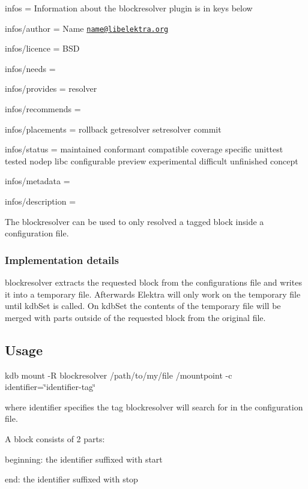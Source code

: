
\begin{DoxyItemize}
\item infos = Information about the blockresolver plugin is in keys below
\item infos/author = Name \href{mailto:name@libelektra.org}{\tt name@libelektra.\+org}
\item infos/licence = B\+S\+D
\item infos/needs =
\item infos/provides = resolver
\item infos/recommends =
\item infos/placements = rollback getresolver setresolver commit
\item infos/status = maintained conformant compatible coverage specific unittest tested nodep libc configurable preview experimental difficult unfinished concept
\item infos/metadata =
\item infos/description =
\end{DoxyItemize}

The {\ttfamily blockresolver} can be used to only resolved a tagged block inside a configuration file.

\subsubsection*{Implementation details}

{\ttfamily blockresolver} extracts the requested block from the configurations file and writes it into a temporary file. Afterwards Elektra will only work on the temporary file until kdb\+Set is called. On kdb\+Set the contents of the temporary file will be merged with parts outside of the requested block from the original file.

\subsection*{Usage}

{\ttfamily kdb mount -\/\+R blockresolver /path/to/my/file /mountpoint -\/c identifier=\char`\"{}identifier-\/tag\char`\"{}}

where {\ttfamily identifier} specifies the tag {\ttfamily blockresolver} will search for in the configuration file.

A block consists of 2 parts\+:
\begin{DoxyItemize}
\item beginning\+: the identifier suffixed with {\ttfamily start}
\item end\+: the identifier suffixed with {\ttfamily stop}
\end{DoxyItemize}

